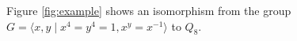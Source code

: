 \documentclass[12pt]{amsart}
\begin{document}





    Figure \ref{fig:example} shows an isomorphism from the group $G= \langle x,y \; | \; x^4=y^4=1, x^y=x^{-1}\rangle$ to $Q_8$. 
\end{document}
